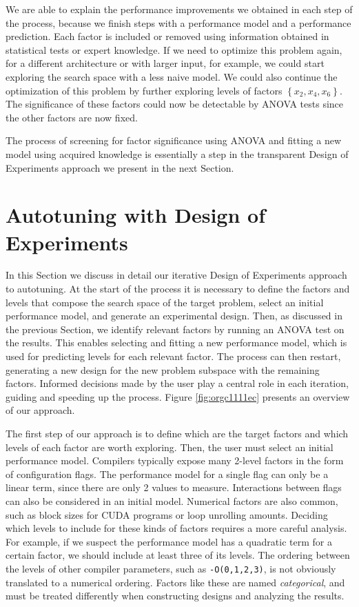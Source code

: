 \documentclass[conference]{IEEEtran}
\begin{document}
We are able to explain the performance improvements we obtained in each step of
the process, because we finish steps with a performance model and a performance
prediction. Each factor is included or removed using information obtained in
statistical tests or expert knowledge. If we need to optimize this problem
again, for a different architecture or with larger input, for example, we could
start exploring the search space with a less naive model. We could also continue
the optimization of this problem by further exploring levels of factors
\(\left\{x_2,x_4,x_6\right\}\). The significance of these factors could now be
detectable by ANOVA tests since the other factors are now fixed.

The process of screening for factor significance using ANOVA and fitting a
new model using acquired knowledge is essentially a step in the transparent
Design of Experiments approach we present in the next Section.
\section{Autotuning with Design of Experiments}
\label{sec:org6592dfe}
In this Section we discuss in detail our iterative Design of Experiments
approach to autotuning. At the start of the process it is necessary to define
the factors and levels that compose the search space of the target problem,
select an initial performance model, and generate an experimental design. Then,
as discussed in the previous Section, we identify relevant factors by running an
ANOVA test on the results. This enables selecting and fitting a new performance
model, which is used for predicting levels for each relevant factor. The process
can then restart, generating a new design for the new problem subspace with the
remaining factors. Informed decisions made by the user play a central role in
each iteration, guiding and speeding up the process. Figure
\ref{fig:orgc1111ec} presents an overview of our approach.

The first step of our approach is to define which are the target factors and
which levels of each factor are worth exploring. Then, the user must select an
initial performance model. Compilers typically expose many 2-level factors in
the form of configuration flags. The performance model for a single flag can
only be a linear term, since there are only 2 values to measure. Interactions
between flags can also be considered in an initial model. Numerical factors are
also common, such as block sizes for CUDA programs or loop unrolling amounts.
Deciding which levels to include for these kinds of factors requires a more
careful analysis. For example, if we suspect the performance model has a
quadratic term for a certain factor, we should include at least three of its
levels. The ordering between the levels of other compiler parameters, such as
\texttt{-O(0,1,2,3)}, is not obviously translated to a numerical ordering.
Factors like these are named \emph{categorical}, and must be treated differently when
constructing designs and analyzing the results.
\end{document}
